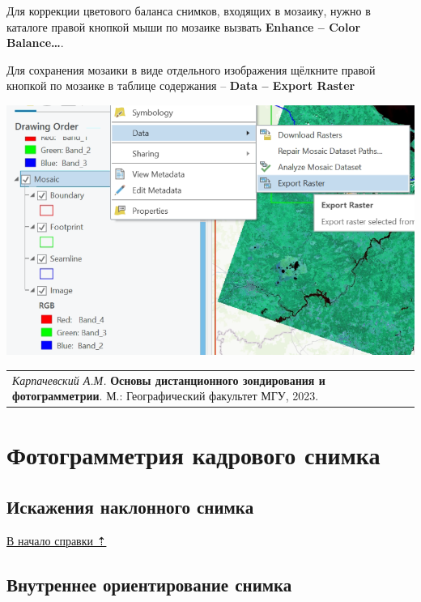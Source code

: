 \documentclass[
  12pt,
]{book}
\begin{document}
Для коррекции цветового баланса снимков, входящих в мозаику, нужно в каталоге правой кнопкой мыши по мозаике вызвать \textbf{Enhance -- Color Balance\ldots{}}.

Для сохранения мозаики в виде отдельного изображения щёлкните правой кнопкой по мозаике в таблице содержания -- \textbf{Data -- Export Raster}

\includegraphics{images/Ref03/Export_Mosaic.png}

\begin{longtable}[]{@{}l@{}}
\toprule\noalign{}
\endhead
\bottomrule\noalign{}
\endlastfoot
\emph{Карпачевский А.М.} \textbf{Основы дистанционного зондирования и фотограмметрии}. М.: Географический факультет МГУ, 2023. \\
\end{longtable}

\hypertarget{photogrammetry}{%
\chapter{Фотограмметрия кадрового снимка}\label{photogrammetry}}

\hypertarget{photogrammetry-oblique}{%
\section{Искажения наклонного снимка}\label{photogrammetry-oblique}}

\protect\hyperlink{photogrammetry}{В начало справки ⇡}

\hypertarget{photogrammetry-interior}{%
\section{Внутреннее ориентирование снимка}\label{photogrammetry-interior}}
\end{document}
